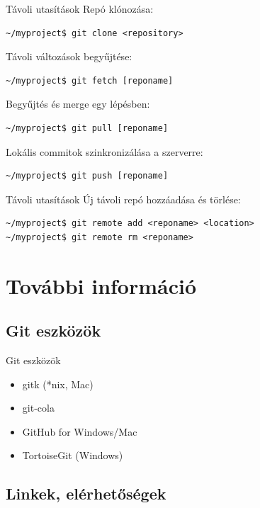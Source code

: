 \documentclass[display,t]{beamer}
\begin{document}
\begin{frame}[fragile]{Távoli utasítások}
    \pause
    Repó klónozása:
\small\begin{verbatim}
~/myproject$ git clone <repository>
\end{verbatim}\normalsize

    \pause
    Távoli változások begyűjtése:
\small\begin{verbatim}
~/myproject$ git fetch [reponame]
\end{verbatim}\normalsize

    \pause
    Begyűjtés és merge egy lépésben:
\small\begin{verbatim}
~/myproject$ git pull [reponame]
\end{verbatim}\normalsize

    \pause
    Lokális commitok szinkronizálása a szerverre:
\small\begin{verbatim}
~/myproject$ git push [reponame]
\end{verbatim}\normalsize
\end{frame}

\begin{frame}[fragile]{Távoli utasítások}
    \pause
    Új távoli repó hozzáadása és törlése:
\small\begin{verbatim}
~/myproject$ git remote add <reponame> <location>
~/myproject$ git remote rm <reponame>
\end{verbatim}\normalsize
\end{frame}

\section{További információ}
\subsection{Git eszközök}

\begin{frame}{Git eszközök}
    \begin{itemize}
        \item gitk (*nix, Mac)
        \item git-cola
        \item GitHub for Windows/Mac
        \item TortoiseGit (Windows)
    \end{itemize}
\end{frame}

\subsection{Linkek, elérhetőségek}
\end{document}

